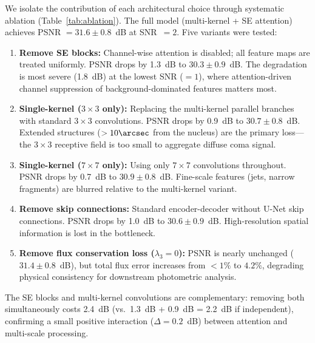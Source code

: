\documentclass[preprint2]{aastex631}
\begin{document}
We isolate the contribution of each architectural choice through systematic ablation (Table~\ref{tab:ablation}). The full model (multi-kernel + SE attention) achieves PSNR $= 31.6 \pm 0.8$~dB at SNR~$=2$. Five variants were tested:

\begin{enumerate}
    \item \textbf{Remove SE blocks:} Channel-wise attention is disabled; all feature maps are treated uniformly. PSNR drops by 1.3~dB to $30.3 \pm 0.9$~dB. The degradation is most severe (1.8~dB) at the lowest SNR ($=1$), where attention-driven channel suppression of background-dominated features matters most.
    \item \textbf{Single-kernel ($3\times3$ only):} Replacing the multi-kernel parallel branches with standard $3\times3$ convolutions. PSNR drops by 0.9~dB to $30.7 \pm 0.8$~dB. Extended structures ($>10\arcsec$ from the nucleus) are the primary loss---the $3\times3$ receptive field is too small to aggregate diffuse coma signal.
    \item \textbf{Single-kernel ($7\times7$ only):} Using only $7\times7$ convolutions throughout. PSNR drops by 0.7~dB to $30.9 \pm 0.8$~dB. Fine-scale features (jets, narrow fragments) are blurred relative to the multi-kernel variant.
    \item \textbf{Remove skip connections:} Standard encoder-decoder without U-Net skip connections. PSNR drops by 1.0~dB to $30.6 \pm 0.9$~dB. High-resolution spatial information is lost in the bottleneck.
    \item \textbf{Remove flux conservation loss ($\lambda_3 = 0$):} PSNR is nearly unchanged ($31.4 \pm 0.8$~dB), but total flux error increases from $<1\%$ to $4.2\%$, degrading physical consistency for downstream photometric analysis.
\end{enumerate}

The SE blocks and multi-kernel convolutions are complementary: removing both simultaneously costs 2.4~dB (vs.\ 1.3~dB + 0.9~dB = 2.2~dB if independent), confirming a small positive interaction ($\Delta = 0.2$~dB) between attention and multi-scale processing.
\end{document}

